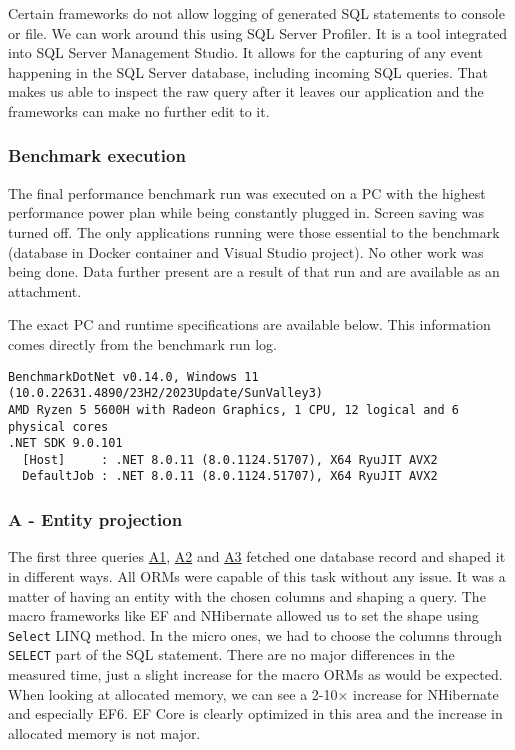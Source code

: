 Certain frameworks do not allow logging of generated SQL statements to console or file. We can work around this using SQL Server Profiler\cite{sqlProfiler}. It is a tool integrated into SQL Server Management Studio. It allows for the capturing of any event happening in the SQL Server database, including incoming SQL queries. That makes us able to inspect the raw query after it leaves our application and the frameworks can make no further edit to it.

\subsubsection{Benchmark execution}
The final performance benchmark run was executed on a PC with the highest performance power plan while being constantly plugged in. Screen saving was turned off. The only applications running were those essential to the benchmark (database in Docker container and Visual Studio project). No other work was being done. Data further present are a result of that run and are available as an attachment.

The exact PC and runtime specifications are available below. This information comes directly from the benchmark run log. 
\begin{lstlisting}
BenchmarkDotNet v0.14.0, Windows 11 (10.0.22631.4890/23H2/2023Update/SunValley3)
AMD Ryzen 5 5600H with Radeon Graphics, 1 CPU, 12 logical and 6 physical cores
.NET SDK 9.0.101
  [Host]     : .NET 8.0.11 (8.0.1124.51707), X64 RyuJIT AVX2
  DefaultJob : .NET 8.0.11 (8.0.1124.51707), X64 RyuJIT AVX2
\end{lstlisting}

\subsubsection{A - Entity projection}
The first three queries \hyperref[query:a1]{A1}, \hyperref[query:a2]{A2} and \hyperref[query:a3]{A3} fetched one database record and shaped it in different ways. All ORMs were capable of this task without any issue. It was a matter of having an entity with the chosen columns and shaping a query. The macro frameworks like EF and NHibernate allowed us to set the shape using \texttt{Select} LINQ method. In the micro ones, we had to choose the columns through \texttt{SELECT} part of the SQL statement. 
There are no major differences in the measured time, just a slight increase for the macro ORMs as would be expected. When looking at allocated memory, we can see a 2-10$\times$ increase for NHibernate  and especially EF6. EF Core is clearly optimized in this area and the increase in allocated memory is not major. 

